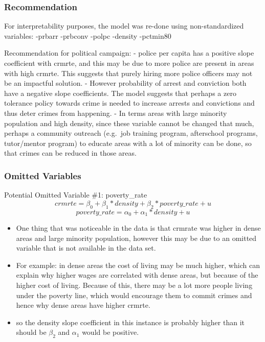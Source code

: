 \documentclass[]{article}
\providecommand{\tightlist}{%
  \setlength{\itemsep}{0pt}\setlength{\parskip}{0pt}}
\begin{document}
\subsubsection{Recommendation}\label{recommendation}

For interpretability purposes, the model was re-done using
non-standardized variables: -prbarr -prbconv -polpc -density -pctmin80

Recommendation for political campaign: - police per capita has a
positive slope coefficient with crmrte, and this may be due to more
police are present in areas with high crmrte. This suggests that purely
hiring more police officers may not be an impactful solution. - However
probability of arrest and conviction both have a negative slope
coefficients. The model suggests that perhaps a zero tolerance policy
towards crime is needed to increase arrests and convictions and thus
deter crimes from happening. - In terms areas with large minority
population and high density, since these variable cannot be changed that
much, perhaps a community outreach (e.g.~job training program,
afterschool programs, tutor/mentor program) to educate areas with a lot
of minority can be done, so that crimes can be reduced in those areas.

\subsubsection{Omitted Variables}\label{omitted-variables}

Potential Omitted Variable \#1: poverty\_rate
\[ crmrte = \beta_0 + \beta_1*density + \beta_2*poverty\_rate + u\]
\[ poverty\_rate = \alpha_0 + \alpha_1*density +u \]

\begin{itemize}
\tightlist
\item
  One thing that was noticeable in the data is that crmrate was higher
  in dense areas and large minority population, however this may be due
  to an omitted variable that is not available in the data set.
\item
  For example: in dense areas the cost of living may be much higher,
  which can explain why higher wages are correlated with dense areas,
  but because of the higher cost of living. Because of this, there may
  be a lot more people living under the poverty line, which would
  encourage them to commit crimes and hence why dense areas have higher
  crmrte.
\item
  so the density slope coefficient in this instance is probably higher
  than it should be \(\beta_2\) and \(\alpha_1\) would be positive.
\end{itemize}
\end{document}
